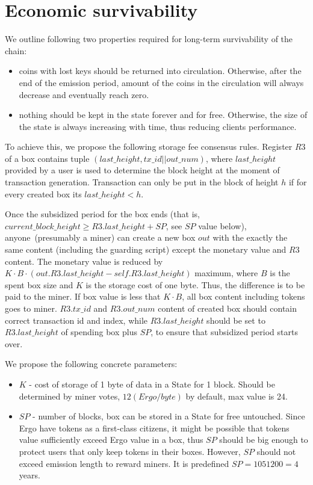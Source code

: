\section{Economic survivability}

We outline following two properties required for long-term survivability of the chain:

\begin{itemize}
    \item{} coins with lost keys should be returned into circulation.
    Otherwise, after the end of the emission period, amount of the coins
    in the circulation will always decrease and eventually reach zero.
    \item{} nothing should be kept in the state forever and for free.
    Otherwise, the size of the state is always increasing with time, thus reducing clients performance.
\end{itemize}

To achieve this, we propose the following storage fee consensus rules.
Register $R3$ of a box contains tuple $(last\_height, tx\_id || out\_num)$, where $last\_height$ provided by a user
is used to determine the block height at the moment of transaction generation.
Transaction can only be put in the block of height $h$ if for every created box its $last\_height < h$.

Once the subsidized period for the box ends (that is,
$current\_block\_height \ge R3.last\_height + SP$, see $SP$ value below), anyone~(presumably a miner) can
create a new box $out$ with the exactly the same content (including the guarding
script) except the monetary value and $R3$ content. The monetary value is
reduced by $K \cdot B \cdot (out.R3.last\_height - self.R3.last\_height)$ maximum, where $B$ is the spent box size and $K$ is the storage cost of one byte.
Thus, the difference is to be paid to the miner.
If box value is less that $K \cdot B$, all box content including tokens goes to miner.
$R3.tx\_id$ and $R3.out\_num$ content of created box should contain correct transaction id
and index, while $R3.last\_height$ should be set to $R3.last\_height$ of spending box
plus $SP$, to ensure that subsidized period starts over.

We propose the following concrete parameters:
\begin{itemize}
    \item{} $K$ - cost of storage of 1 byte of data in a State for 1 block.
    Should be determined by miner votes, $12 (Ergo/byte)$ by default, max value is 24.
    \item{} $SP$ - number of blocks, box can be stored in a State for free untouched.
    Since Ergo have tokens as a first-class citizens, it might be possible that tokens value
    sufficiently exceed Ergo value in a box, thus $SP$ should be big enough to protect users
    that only keep tokens in their boxes.
    However, $SP$ should not exceed emission length to reward miners.
    It is predefined $SP = 1051200 = 4$ years.
\end{itemize}